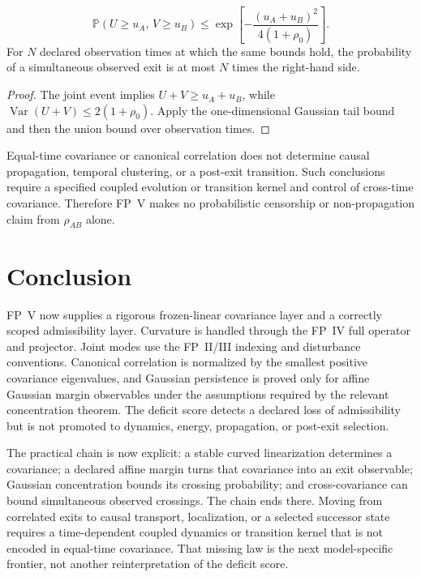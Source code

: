 \documentclass[11pt]{article}
\begin{document}
\begin{lemma}\label{lem:simultaneous}
\[
 \mathbb P(U\ge u_A,\,V\ge u_B)
 \le
 \exp\!\left[-\frac{(u_A+u_B)^2}{4(1+\rho_0)}\right].
\]
For $N$ declared observation times at which the same bounds hold, the
probability of a simultaneous observed exit is at most $N$ times the
right-hand side.
\end{lemma}

\begin{proof}
The joint event implies $U+V\ge u_A+u_B$, while
$\operatorname{Var}(U+V)\le2(1+\rho_0)$. Apply the one-dimensional Gaussian
tail bound and then the union bound over observation times.
\end{proof}

\begin{proposition}
Equal-time covariance or canonical correlation does not determine causal
propagation, temporal clustering, or a post-exit transition. Such conclusions
require a specified coupled evolution or transition kernel and control of
cross-time covariance. Therefore FP~V makes no probabilistic censorship or
non-propagation claim from $\rho_{AB}$ alone.
\end{proposition}

\section{Conclusion}

FP~V now supplies a rigorous frozen-linear covariance layer and a correctly
scoped admissibility layer. Curvature is handled through the FP~IV full
operator and projector. Joint modes use the FP~II/III indexing and disturbance
conventions. Canonical correlation is normalized by the smallest positive
covariance eigenvalues, and Gaussian persistence is proved only for affine
Gaussian margin observables under the assumptions required by the relevant
concentration theorem. The deficit score detects a declared loss of
admissibility but is not promoted to dynamics, energy, propagation, or
post-exit selection.

The practical chain is now explicit: a stable curved linearization determines
a covariance; a declared affine margin turns that covariance into an exit
observable; Gaussian concentration bounds its crossing probability; and
cross-covariance can bound simultaneous observed crossings.  The chain ends
there.  Moving from correlated exits to causal transport, localization, or a
selected successor state requires a time-dependent coupled dynamics or
transition kernel that is not encoded in equal-time covariance.  That missing
law is the next model-specific frontier, not another reinterpretation of the
deficit score.
\end{document}
